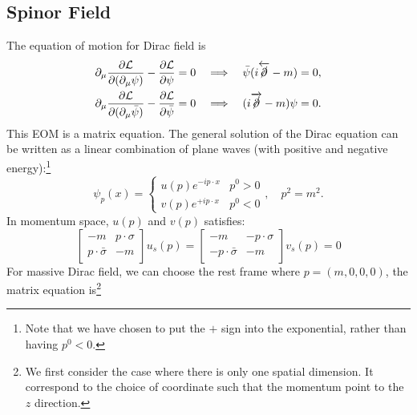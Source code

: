 \subsection{Spinor Field}
The equation of motion for Dirac field is
\begin{equation}
\begin{aligned}
	\partial_\mu\frac{\partial\mathcal{L}}{\partial(\partial_\mu\psi)} - \frac{\partial \mathcal L}{\partial \psi} = 0 
	\quad &\Longrightarrow \quad
	\bar\psi(i\overleftarrow{\cancel \partial}-m) = 0, \\
	\partial_\mu\frac{\partial\mathcal{L}}{\partial(\partial_\mu\bar\psi)} - \frac{\partial \mathcal L}{\partial \bar\psi} = 0 
	\quad &\Longrightarrow \quad
	(i\overrightarrow{\cancel \partial}-m)\psi = 0.
\end{aligned}
\end{equation}
This EOM is a matrix equation.
The general solution of the Dirac equation can be written as a linear combination of plane waves (with positive and negative energy):\footnote{Note that we have chosen to put the $+$ sign into the exponential, rather than having $p^{0}<0$.}
\begin{equation}
	\psi_p(x) = \begin{cases}
		u(p) e^{-i p \cdot x} & p^{0}>0 \\
		v(p) e^{+i p \cdot x} & p^{0}<0
	\end{cases}, \quad p^{2}=m^{2}.
\end{equation}
In momentum space, $u(p)$ and $v(p)$ satisfies:
\begin{equation}
	\left[\begin{array}{cc}
		-m & p \cdot \sigma \\ p\cdot \bar\sigma & -m
	\end{array} \right] u_s(p) = 
	\left[\begin{array}{cc}
		-m & -p \cdot \sigma \\ -p\cdot \bar\sigma & -m
	\end{array} \right] v_s(p) = 0
\end{equation}
For massive Dirac field, we can choose the rest frame where $p = (m,0,0,0)$, the matrix equation is\footnote{We first consider the case where there is only one spatial dimension. It correspond to the choice of coordinate such that the momentum point to the $z$ direction.}
